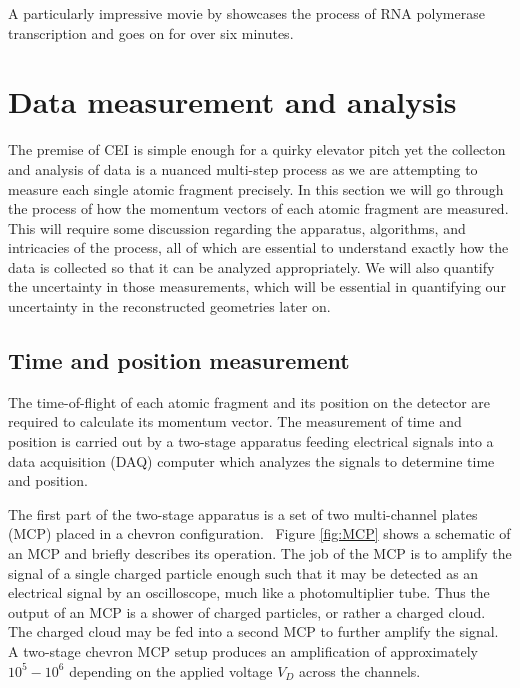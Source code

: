 A particularly impressive movie by \citet{Cheung12} showcases the process of RNA polymerase transcription and goes on for over six minutes.

\section{Data measurement and analysis}
The premise of CEI is simple enough for a quirky elevator pitch yet the collecton and analysis of data is a nuanced multi-step process as we are attempting to measure each single atomic fragment precisely. In this section we will go through the process of how the momentum vectors of each atomic fragment are measured. This will require some discussion regarding the apparatus, algorithms, and intricacies of the process, all of which are essential to understand exactly how the data is collected so that it can be analyzed appropriately. We will also quantify the uncertainty in those measurements, which will be essential in quantifying our uncertainty in the reconstructed geometries later on.

\subsection{Time and position measurement}
The time-of-flight of each atomic fragment and its position on the detector are required to calculate its momentum vector. The measurement of time and position is carried out by a two-stage apparatus feeding electrical signals into a data acquisition (DAQ) computer which analyzes the signals to determine time and position.

The first part of the two-stage apparatus is a set of two multi-channel plates (MCP) placed in a chevron configuration.\footnotemark~ Figure \ref{fig:MCP} shows a schematic of an MCP and briefly describes its operation. The job of the MCP is to amplify the signal of a single charged particle enough such that it may be detected as an electrical signal by an oscilloscope, much like a photomultiplier tube. Thus the output of an MCP is a shower of charged particles, or rather a charged cloud. The charged cloud may be fed into a second MCP to further amplify the signal. A two-stage chevron MCP setup produces an amplification of approximately $10^5-10^6$ depending on the applied voltage $V_D$ across the channels.


